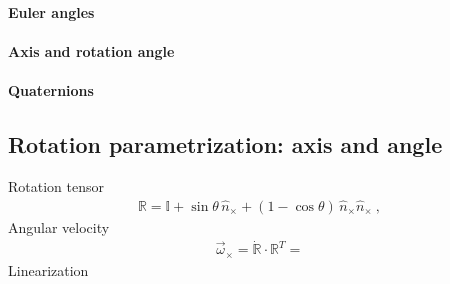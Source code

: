 \documentclass[letterpaper,10pt,english]{jupyterBook}
\begin{document}
\paragraph{Euler angles}
\label{\detokenize{ch/kinematics-rotations-tensors:euler-angles}}\label{\detokenize{ch/kinematics-rotations-tensors:classical-mechanics-kinematics-rotations-param-euler}}

\paragraph{Axis and rotation angle}
\label{\detokenize{ch/kinematics-rotations-tensors:axis-and-rotation-angle}}\label{\detokenize{ch/kinematics-rotations-tensors:classical-mechanics-kinematics-rotations-param-axis}}

\paragraph{Quaternions}
\label{\detokenize{ch/kinematics-rotations-tensors:quaternions}}\label{\detokenize{ch/kinematics-rotations-tensors:classical-mechanics-kinematics-rotations-param-quaternions}}
\sphinxstepscope


\subsection{Rotation parametrization: axis and angle}
\label{\detokenize{ch/kinematics-rotations-param-axis-angle:rotation-parametrization-axis-and-angle}}\label{\detokenize{ch/kinematics-rotations-param-axis-angle:classical-mechanics-kinematics-rotations-axis-angle}}\label{\detokenize{ch/kinematics-rotations-param-axis-angle::doc}}
\sphinxAtStartPar
Rotation tensor
\begin{equation}\label{equation:ch/kinematics-rotations-param-axis-angle:eq:R:aa}
\begin{split}\mathbb{R} = \mathbb{I} + \sin \theta \, \hat{n}_\times + ( 1 - \cos \theta ) \, \hat{n}_\times \hat{n}_\times \ ,\end{split}
\end{equation}
\sphinxAtStartPar
Angular velocity
\begin{equation*}
\begin{split}\vec{\omega}_\times = \dot{\mathbb{R}} \cdot \mathbb{R}^T = \end{split}
\end{equation*}
\sphinxAtStartPar
Linearization
\end{document}
